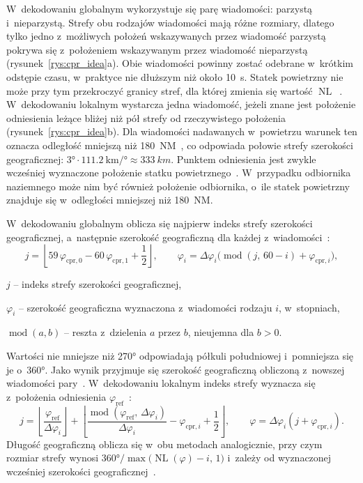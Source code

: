 W~dekodowaniu globalnym wykorzystuje się parę wiadomości: parzystą i~nieparzystą. Strefy obu rodzajów wiadomości mają różne rozmiary, dlatego tylko jedno z~możliwych położeń wskazywanych przez wiadomość parzystą pokrywa się z~położeniem wskazywanym przez wiadomość nieparzystą (rysunek~\ref{rys:cpr_idea}a). Obie wiadomości powinny zostać odebrane w~krótkim odstępie czasu, w~praktyce nie dłuższym niż około \SI{10}{s}. Statek powietrzny nie może przy tym przekroczyć granicy stref, dla której zmienia się wartość $\operatorname{NL}$~\cite{sun2021}. W~dekodowaniu lokalnym wystarcza jedna wiadomość, jeżeli znane jest położenie odniesienia leżące bliżej niż pół strefy od rzeczywistego położenia (rysunek~\ref{rys:cpr_idea}b). Dla wiadomości nadawanych w~powietrzu warunek ten oznacza odległość mniejszą niż \SI{180}{NM}~\cite{sun2021}, co odpowiada połowie strefy szerokości geograficznej: $\ang{3} \cdot \SI[per-mode=symbol]{111.2}{\kilo\metre\per\degree} \approx \SI{333}{km}$. Punktem odniesienia jest zwykle wcześniej wyznaczone położenie statku powietrznego~\cite{sun2021}. W~przypadku odbiornika naziemnego może nim być również położenie odbiornika, o~ile statek powietrzny znajduje się w~odległości mniejszej niż \SI{180}{NM}.

W~dekodowaniu globalnym oblicza się najpierw indeks strefy szerokości geograficznej, a~następnie szerokość geograficzną dla każdej z~wiadomości~\cite{sun2021}:
\begin{equation}
  j = \left\lfloor 59\,\varphi_{\mathrm{cpr},0} - 60\,\varphi_{\mathrm{cpr},1} + \frac{1}{2} \right\rfloor,
  \qquad
  \varphi_i = \Delta\varphi_i \bigl( \operatorname{mod}(j,\, 60 - i) + \varphi_{\mathrm{cpr},i} \bigr),
  \label{eq:globalne}
\end{equation}
\begin{gdzie}
  \item $j$ -- indeks strefy szerokości geograficznej,
  \item $\varphi_i$ -- szerokość geograficzna wyznaczona z~wiadomości rodzaju $i$, w~stopniach,
  \item $\operatorname{mod}(a, b)$ -- reszta z~dzielenia $a$ przez $b$, nieujemna dla $b > 0$.
\end{gdzie}
Wartości nie mniejsze niż \ang{270} odpowiadają półkuli południowej i~pomniejsza się je o~\ang{360}. Jako wynik przyjmuje się szerokość geograficzną obliczoną z~nowszej wiadomości pary~\cite{sun2021}. W~dekodowaniu lokalnym indeks strefy wyznacza się z~położenia odniesienia $\varphi_{\mathrm{ref}}$~\cite{sun2021}:
\begin{equation}
  j = \left\lfloor \frac{\varphi_{\mathrm{ref}}}{\Delta\varphi_i} \right\rfloor
    + \left\lfloor \frac{\operatorname{mod}(\varphi_{\mathrm{ref}},\, \Delta\varphi_i)}{\Delta\varphi_i}
    - \varphi_{\mathrm{cpr},i} + \frac{1}{2} \right\rfloor,
  \qquad
  \varphi = \Delta\varphi_i \left( j + \varphi_{\mathrm{cpr},i} \right).
  \label{eq:lokalne}
\end{equation}
Długość geograficzną oblicza się w~obu metodach analogicznie, przy czym rozmiar strefy wynosi $\ang{360} / \max\bigl(\operatorname{NL}(\varphi) - i,\, 1\bigr)$ i~zależy od wyznaczonej wcześniej szerokości geograficznej~\cite{sun2021}.

